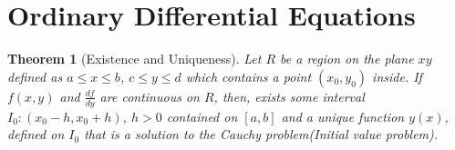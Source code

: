 \documentclass{article}
\newtheorem{theorem}{Theorem}[section]
\begin{document}
\section{Ordinary Differential Equations}

\begin{theorem}[Existence and Uniqueness]
	Let $R$ be a region on the plane $xy$ defined as $a \leq x \leq b$, $c \leq y \leq d$ which contains a point $(x_0, y_0)$ inside. If $f(x,y)$ and $ \frac{df}{dy}$ are continuous on $R$, then, exists some interval $I_0 : (x_0 - h, x_0 + h)$, $h > 0$ contained on $[a,b]$ and a unique function $y(x)$, defined on $I_0$ that is a solution to the Cauchy problem(Initial value problem).
\end{theorem}
\end{document}
